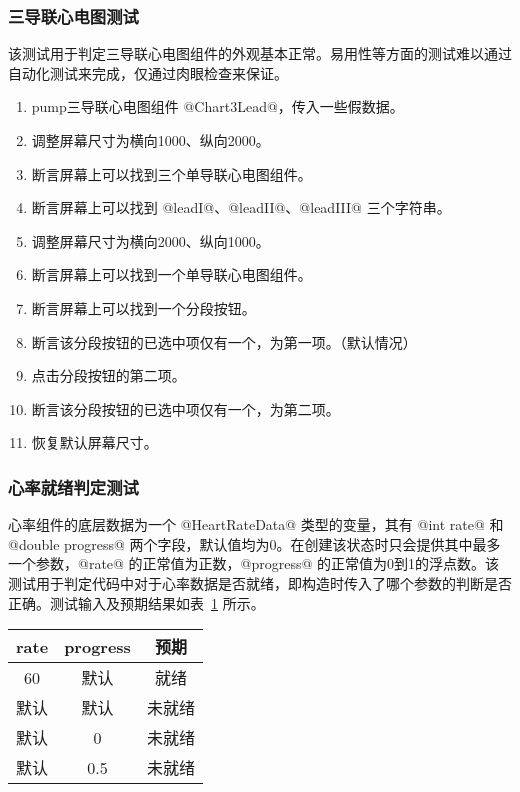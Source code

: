 \subsubsection{三导联心电图测试}

该测试用于判定三导联心电图组件的外观基本正常。易用性等方面的测试难以通过自动化测试来完成，仅通过肉眼检查来保证。

\begin{enumerate}
    \item pump三导联心电图组件 @Chart3Lead@，传入一些假数据。
    \item 调整屏幕尺寸为横向1000、纵向2000。
    \item 断言屏幕上可以找到三个单导联心电图组件。
    \item 断言屏幕上可以找到 @leadI@、@leadII@、@leadIII@ 三个字符串。
    \item 调整屏幕尺寸为横向2000、纵向1000。
    \item 断言屏幕上可以找到一个单导联心电图组件。
    \item 断言屏幕上可以找到一个分段按钮。
    \item 断言该分段按钮的已选中项仅有一个，为第一项。（默认情况）
    \item 点击分段按钮的第二项。
    \item 断言该分段按钮的已选中项仅有一个，为第二项。
    \item 恢复默认屏幕尺寸。
\end{enumerate}

\subsubsection{心率就绪判定测试}

心率组件的底层数据为一个 @HeartRateData@ 类型的变量，其有 @int rate@ 和 @double progress@ 两个字段，默认值均为0。在创建该状态时只会提供其中最多一个参数，@rate@ 的正常值为正数，@progress@ 的正常值为0到1的浮点数。该测试用于判定代码中对于心率数据是否就绪，即构造时传入了哪个参数的判断是否正确。测试输入及预期结果如表~\ref{tab:heart-rate-ready} 所示。

\begin{table}[!ht]
    \centering
    \label{tab:heart-rate-ready}
    \begin{tabular}{|c|c|c|}
        \hline
        rate & progress & 预期  \\
        \hline
        60   & 默认       & 就绪  \\
        \hline
        默认   & 默认       & 未就绪 \\
        \hline
        默认   & 0        & 未就绪 \\
        \hline
        默认   & 0.5      & 未就绪 \\
        \hline
    \end{tabular}
\end{table}

